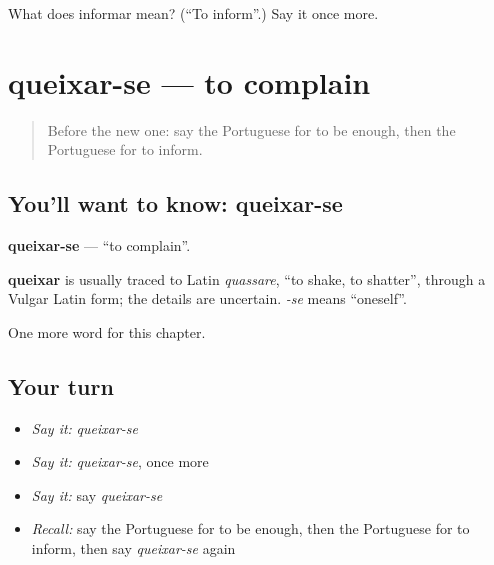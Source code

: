 \begin{tcolorbox}[breakable,colback=teal!4,colframe=teal!35!black,title={Before you move on}]
What does informar mean? (\textquotedblleft{}To inform\textquotedblright{}.) Say it once more.
\end{tcolorbox}
\section[queixar-se]{queixar-se — to complain}

\label{lesson:PT-C175-queixar-se}



\begin{quote}
Before the new one: say the Portuguese for to be enough, then the Portuguese for to inform.
\end{quote}

\subsection*{You'll want to know: queixar-se}
\textbf{queixar-se} — \textquotedblleft{}to complain\textquotedblright{}.

\begin{cousinweb}
\textbf{queixar} is usually traced to Latin \emph{quassare}, \textquotedblleft{}to shake, to shatter\textquotedblright{}, through a Vulgar Latin form; the details are uncertain. \emph{-se} means \textquotedblleft{}oneself\textquotedblright{}.
\end{cousinweb}

\begin{grammarlens}[title={What you've built}]
One more word for this chapter.
\end{grammarlens}

\subsection*{Your turn}
\begin{itemize}
\raggedright
  \item \emph{Say it:} \emph{queixar-se}
  \item \emph{Say it:} \emph{queixar-se}, once more
  \item \emph{Say it:} say \emph{queixar-se}
  \item \emph{Recall:} say the Portuguese for to be enough, then the Portuguese for to inform, then say \emph{queixar-se} again
\end{itemize}

